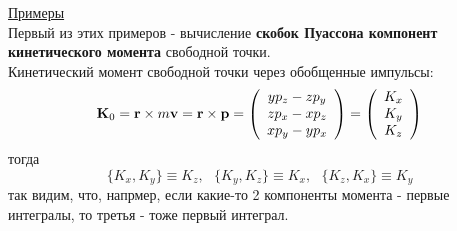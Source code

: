 \documentclass[specialist, subf, href, colorlinks=true, 12pt, times, mtpro, final]{disser}
\theoremstyle{definition}
\begin{document}
	\hyperlink {lects.21}{Примеры} \\
	Первый из этих примеров - вычисление \textbf{скобок Пуассона компонент кинетического момента} свободной точки.\\
	Кинетический момент свободной точки через обобщенные импульсы:
	$$
		\mathbf{K}_0 = \mathbf{r} \times m\mathbf{v} = \mathbf{r} \times \mathbf{p} = 
		\left(
			\begin{array}{c}
				yp_z - zp_y \\
				zp_x - xp_z \\
				xp_y - yp_x \\
			\end{array}
		\right)
		= 
		\left(
			\begin{array}{c}
				K_x \\
				K_y \\
				K_z \\
			\end{array} 
		\right)
	$$
	тогда 
	$$
		\{K_x,K_y\} \equiv K_z, \ \ \ \{K_y,K_z\} \equiv K_x, \ \ \ \{K_z,K_x\} \equiv K_y
	$$
	так видим, что, напрмер, если какие-то 2 компоненты момента - первые интегралы, то третья - тоже первый интеграл.
    
\end{document}

